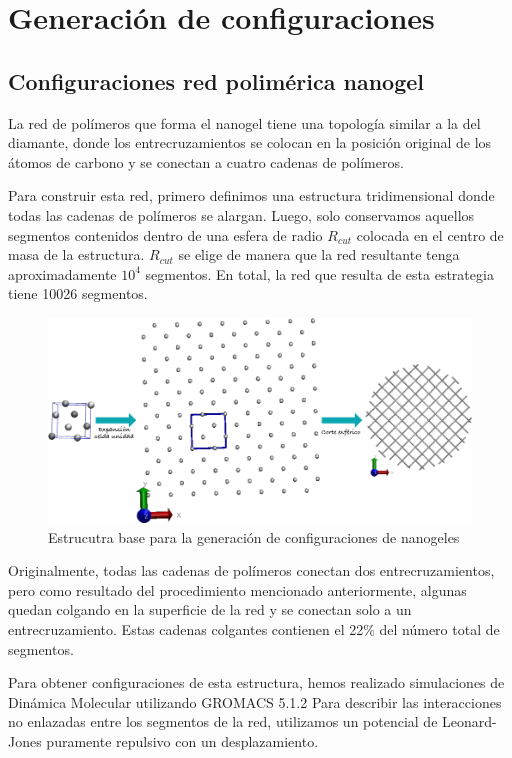 \chapter{Generaci\'on de configuraciones}\label{anexo-configuraciones}



\section{Configuraciones red polim\'erica nanogel}

La red de pol\'imeros que forma el nanogel tiene una topolog\'ia similar a la del diamante, donde los entrecruzamientos se colocan en la posici\'on original de los \'atomos de carbono y se conectan a cuatro cadenas de pol\'imeros.

Para construir esta red, primero definimos una estructura tridimensional donde todas las cadenas de pol\'imeros se alargan. Luego, solo conservamos aquellos segmentos contenidos dentro de una esfera de radio $R_{cut}$ colocada en el centro de masa de la estructura. $R_{cut}$ se elige de manera que la red resultante tenga aproximadamente $10^4$ segmentos. En total, la red que resulta de esta estrategia tiene 10026 segmentos.

\begin{figure}[!ht]
	\centering
	\includegraphics[width=0.5\linewidth]{Figures/graph-anexos/esquema.png}
	\caption{Estrucutra base para la generaci\'on de configuraciones de nanogeles}
	\label{fig:anexo:equema-gel}
\end{figure}




Originalmente, todas las cadenas de pol\'imeros conectan dos entrecruzamientos, pero como resultado del procedimiento mencionado anteriormente, algunas quedan colgando en la superficie de la red y se conectan solo a un entrecruzamiento. Estas cadenas colgantes contienen el 22\% del n\'umero total de segmentos.

Para obtener configuraciones de esta estructura, hemos realizado simulaciones de Din\'amica Molecular utilizando GROMACS 5.1.2 \cite{lindahl2001gromacs}
Para describir las interacciones no enlazadas entre los segmentos de la red, utilizamos un potencial de Leonard-Jones puramente repulsivo con un desplazamiento.


